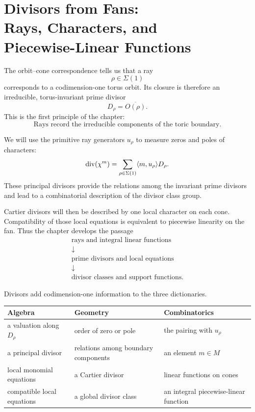 \chapter[Divisors from Fans]
{Divisors from Fans:\\ Rays, Characters, and\\ Piecewise-Linear Functions}
\label{chap:divisors-from-fans}

\begin{chapteroverview}
The orbit--cone correspondence tells us that a ray
\[
\rho\in\Sigma(1)
\]
corresponds to a codimension-one torus orbit. Its closure is therefore
an irreducible, torus-invariant prime divisor
\[
D_\rho=\overline{O(\rho)}.
\]
This is the first principle of the chapter:
\[
\boxed{\text{Rays record the irreducible components of the toric boundary.}}
\]

We will use the primitive ray generators \(u_\rho\) to measure zeros
and poles of characters:
\[
\operatorname{div}(\chi^{m})
=
\sum_{\rho\in\Sigma(1)}
\langle m,u_\rho\rangle D_\rho.
\]
These principal divisors provide the relations among the invariant
prime divisors and lead to a combinatorial description of the divisor
class group.

Cartier divisors will then be described by one local character on
each cone. Compatibility of those local equations is equivalent to
piecewise linearity on the fan. Thus the chapter develops the passage
\[
\begin{array}{c}
\text{rays and integral linear functions}
\\[-1mm]
\downarrow
\\[-1mm]
\text{prime divisors and local equations}
\\[-1mm]
\downarrow
\\[-1mm]
\text{divisor classes and support functions}.
\end{array}
\]

\end{chapteroverview}

\begin{threedictionaries}
Divisors add codimension-one information to the three dictionaries.

\medskip

\begin{center}
\small
\begin{tabularx}{\linewidth}{@{}
  >{\raggedright\arraybackslash}X
  >{\raggedright\arraybackslash}X
  >{\raggedright\arraybackslash}X@{}}
\toprule
\textbf{Algebra}
&
\textbf{Geometry}
&
\textbf{Combinatorics}
\\
\midrule
a valuation along \(D_\rho\)
&
order of zero or pole
&
the pairing with \(u_\rho\)
\\[1mm]
a principal divisor
&
relations among boundary components
&
an element \(m\in M\)
\\[1mm]
local monomial equations
&
a Cartier divisor
&
linear functions on cones
\\[1mm]
compatible local equations
&
a global divisor class
&
an integral piecewise-linear function
\\
\bottomrule
\end{tabularx}
\end{center}
\end{threedictionaries}

